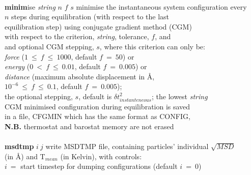 \begin{tabbing}
\>                                              \> \\
\> {\bf minim}ise {\em string} $n$ $f$ $s$      \> minimise the instantaneous system configuration every \\
\>                                              \> $n$ steps during equilibration (with respect to the last \\
\>                                              \> equilibration step) using conjugate gradient method (CGM) \\
\>                                              \> with respect to the criterion, {\em string}, tolerance, $f$, and \\
\>                                              \> and optional CGM stepping, $s$, where this criterion can only be: \\
\>                                              \> {\em force} ($1~\le~f~\le~1000$, default $f~=~50$) or \\
\>                                              \> {\em energy} ($0~<~f~\le~0.01$, default $f~=~0.005$) or \\
\>                                              \> {\em distance} (maximum absolute displacement in \AA, \\
\>                                              \> $10^{-6}~\le~f~\le~0.1$, default $f~=~0.005$); \\
\>                                              \> the optional stepping, $s$, default is $\delta t_{instanteneous}^{2}$; the lowest {\em string} \\
\>                                              \> CGM minimised configuration during equilibration is saved \\
\>                                              \> in a file, CFGMIN which has the same format as CONFIG, \\
\>                                              \> {\bf N.B.} thermostat and barostat memory are not erased \\
\>                                              \> \\
\> {\bf msdtmp} $i~j$                           \> write MSDTMP file, containing particles' individual $\sqrt{MSD}$ \\
\>                                              \> (in \AA) and T$_{mean}$ (in Kelvin), with controls: \\
\>                                              \> $i~=$ start timestep for dumping configurations (default $i~=~0$) \\

\end{tabbing}
